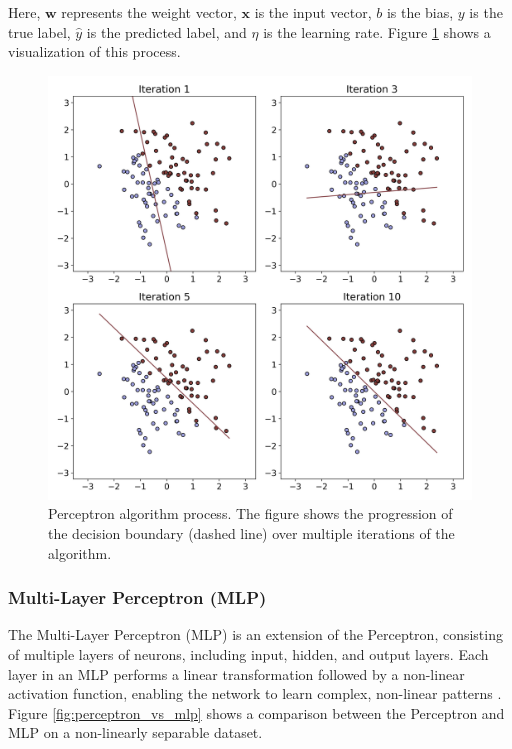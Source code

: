 \documentclass[english,11pt,a4paper,titlepage]{article}
\begin{document}
	Here, \( \mathbf{w} \) represents the weight vector, \( \mathbf{x} \) is the input vector, \( b \) is the bias, \( y \) is the true label, \( \hat{y} \) is the predicted label, and \( \eta \) is the learning rate. Figure \ref{fig:perceptron_algorithm} shows a visualization of this process.
	
	\begin{figure}[h]
		\centering
		\includegraphics[width=0.8\linewidth]{img/perceptron.png}
		\caption{Perceptron algorithm process. The figure shows the progression of the decision boundary (dashed line) over multiple iterations of the algorithm.}
		\label{fig:perceptron_algorithm}
	\end{figure}
	
	\subsubsection*{Multi-Layer Perceptron (MLP)}
	The Multi-Layer Perceptron (MLP) is an extension of the Perceptron, consisting of multiple layers of neurons, including input, hidden, and output layers. Each layer in an MLP performs a linear transformation followed by a non-linear activation function, enabling the network to learn complex, non-linear patterns \cite{hintonConnectionistLearningProcedures1989}. Figure \ref{fig:perceptron_vs_mlp} shows a comparison between the Perceptron and MLP on a non-linearly separable dataset.
	
\end{document}
